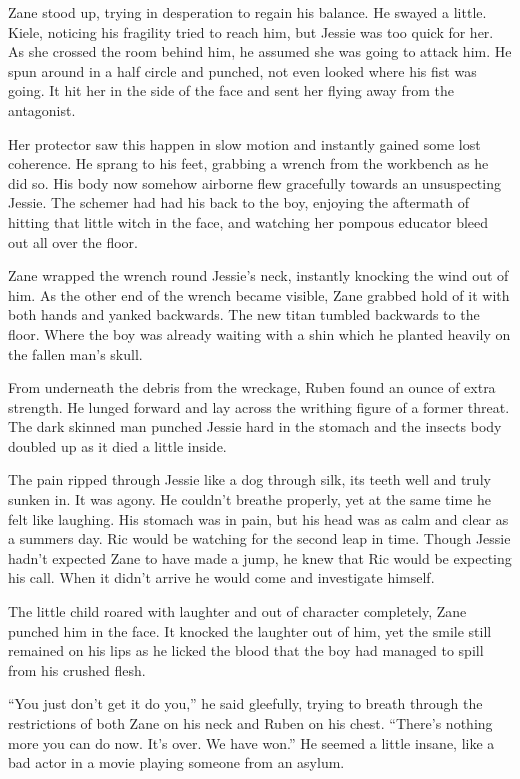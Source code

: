 Zane stood up, trying in desperation to regain his balance.  He swayed a little.  Kiele, noticing his fragility tried to reach him, but Jessie was too quick for her.  As she crossed the room behind him, he assumed she was going to attack him.  He spun around in a half circle and punched, not even looked where his fist was going.  It hit her in the side of the face and sent her flying away from the antagonist.  

Her protector saw this happen in slow motion and instantly gained some lost coherence.  He sprang to his feet, grabbing a wrench from the workbench as he did so.  His body now somehow airborne flew gracefully towards an unsuspecting Jessie.  The schemer had had his back to the boy, enjoying the aftermath of hitting that little witch in the face, and watching her pompous educator bleed out all over the floor.  

Zane wrapped the wrench round Jessie's neck, instantly knocking the wind out of him.  As the other end of the wrench became visible, Zane grabbed hold of it with both hands and yanked backwards.  The new titan tumbled backwards to the floor.  Where the boy was already waiting with a shin which he planted heavily on the fallen man's skull.

From underneath the debris from the wreckage, Ruben found an ounce of extra strength.  He lunged forward and lay across the writhing figure of a former threat.  The dark skinned man punched Jessie hard in the stomach and the insects body doubled up as it died a little inside.  

The pain ripped through Jessie like a dog through silk, its teeth well and truly sunken in.  It was agony.  He couldn't breathe properly, yet at the same time he felt like laughing.  His stomach was in pain, but his head was as calm and clear as a summers day.  Ric would be watching for the second leap in time.  Though Jessie hadn't expected Zane to have made a jump, he knew that Ric would be expecting his call.  When it didn't arrive he would come and investigate himself.  

The little child roared with laughter and out of character completely, Zane punched him in the face.  It knocked the laughter out of him, yet the smile still remained on his lips as he licked the blood that the boy had managed to spill from his crushed flesh.

``You just don't get it do you,'' he said gleefully, trying to breath through the restrictions of both Zane on his neck and Ruben on his chest.  ``There's nothing more you can do now.  It's over.  We have won.''  He seemed a little insane, like a bad actor in a movie playing someone from an asylum.   

